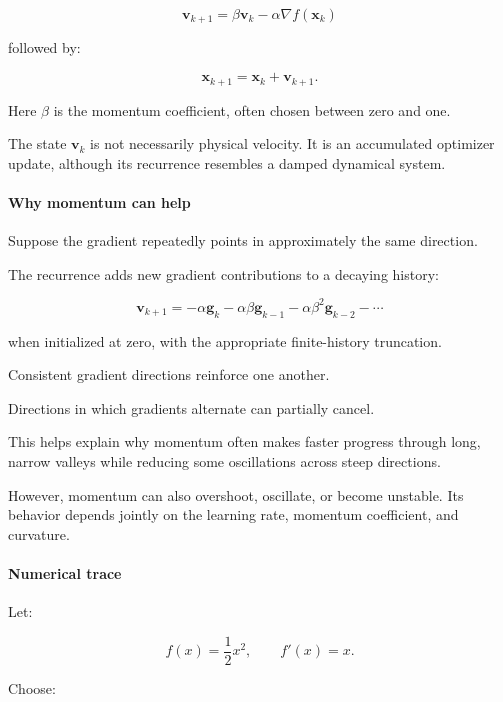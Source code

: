 \[
\boxed{ \mathbf v_{k+1} = \beta\mathbf v_k-\alpha\nabla f(\mathbf x_k) }
\]

followed by:

\[
\boxed{ \mathbf x_{k+1}=\mathbf x_k+\mathbf v_{k+1} }.
\]

Here \(\beta\) is the momentum coefficient, often chosen between zero and one.

The state \(\mathbf v_k\) is not necessarily physical velocity. It is an accumulated optimizer update, although its recurrence resembles a damped dynamical system.

\paragraph{Why momentum can help}\label{02-foundations-ii-ch026-why-momentum-can-help}

\hypertarget{02-foundations-ii-ch026-why-momentum-can-help}{}

Suppose the gradient repeatedly points in approximately the same direction.

The recurrence adds new gradient contributions to a decaying history:

\[
\mathbf v_{k+1} = -\alpha\mathbf g_k -\alpha\beta\mathbf g_{k-1} -\alpha\beta^2\mathbf g_{k-2} -\cdots
\]

when initialized at zero, with the appropriate finite-history truncation.

Consistent gradient directions reinforce one another.

Directions in which gradients alternate can partially cancel.

This helps explain why momentum often makes faster progress through long, narrow valleys while reducing some oscillations across steep directions.

However, momentum can also overshoot, oscillate, or become unstable. Its behavior depends jointly on the learning rate, momentum coefficient, and curvature.

\paragraph{Numerical trace}\label{02-foundations-ii-ch026-numerical-trace}

\hypertarget{02-foundations-ii-ch026-numerical-trace}{}

Let:

\[
f(x)=\frac12x^2,\qquad f'(x)=x.
\]

Choose:

